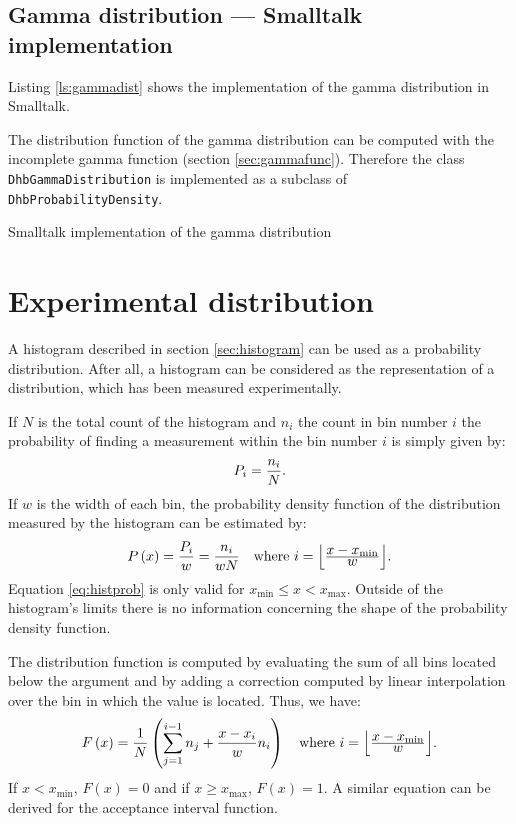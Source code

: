 \subsection{Gamma distribution --- Smalltalk implementation}
\label{sec:sgammadist}  Listing \ref{ls:gammadist} shows the implementation of
the gamma distribution in Smalltalk.

The distribution function of the gamma distribution can be
computed with the incomplete gamma function (\cf section
\ref{sec:gammafunc}). Therefore the class {\tt
DhbGammaDistribution} is implemented as a subclass of {\tt
DhbProbabilityDensity}.
\begin{listing} Smalltalk implementation of the gamma distribution \label{ls:gammadist}

\end{listing}


\section{Experimental distribution}
A histogram described in section \ref{sec:histogram} can be used
as a probability distribution. After all, a histogram can be
considered as the representation of a distribution, which has been
measured experimentally.

If $N$ is the total count of the histogram and $n_i$ the count in
bin number $i$ the probability of finding a measurement within the
bin number $i$ is simply given by:
\begin{equation}
  P_i={\displaystyle n_i \over\displaystyle N}.
\end{equation}
If $w$ is the width of each bin, the probability density function
of the distribution measured by the histogram can be estimated by:
\begin{equation}
\label{eq:histprob}
  P\left(x\right)={\displaystyle P_i \over\displaystyle w}
  ={\displaystyle n_i \over\displaystyle wN}\mbox{\quad
  where $i=\left\lfloor{\displaystyle x-x_{\min}\over\displaystyle w}\right\rfloor$.}
\end{equation}
Equation \ref{eq:histprob} is only valid for $x_{\min}\le x <
x_{\max}$. Outside of the histogram's limits there is no
information concerning the shape of the probability density
function.

The distribution function is computed by evaluating the sum of all
bins located below the argument and by adding a correction
computed by linear interpolation over the bin in which the value
is located. Thus, we have:
\begin{equation}
\label{eq:histdistr}
  F\left(x\right)={\displaystyle 1 \over\displaystyle N} \left(\sum_{j=1}^{i-1}n_j
  + {x-x_i \over w}n_i\right)
  \mbox{\quad where $i=\left\lfloor{\displaystyle x-x_{\min}\over\displaystyle w}\right\rfloor$.}
\end{equation}
If $x<x_{\min}$, $F\left(x\right)=0$ and if $x\geq x_{\max}$,
$F\left(x\right)=1$. A similar equation can be derived for the
acceptance interval function.

